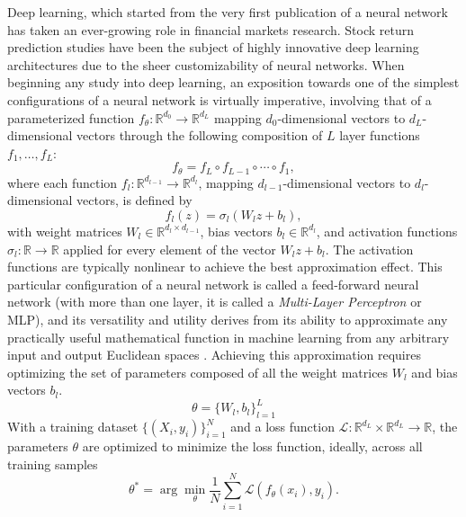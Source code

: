 \documentclass[stu,floatsintext]{apa7}
\begin{document}
Deep learning, which started from the very first publication of a neural network \parencite{rosenblatt1958nn} has taken an ever-growing role in financial markets research. Stock return prediction studies have been the subject of highly innovative deep learning architectures due to the sheer customizability of neural networks. When beginning any study into deep learning, an exposition towards one of the simplest configurations of a neural network is virtually imperative, involving that of a parameterized function $f_{\theta}:\mathbb{R}^{d_0}\to\mathbb{R}^{d_L}$ mapping $d_0$-dimensional vectors to $d_L$-dimensional vectors through the following composition of $L$ layer functions $f_1,\dots,f_L$:
\begin{equation}f_{\theta} = f_L \circ f_{L-1} \circ \cdots \circ f_1,\end{equation}
where each function $f_l:\mathbb{R}^{d_{l-1}}\to\mathbb{R}^{d_l}$, mapping $d_{l-1}$-dimensional vectors to $d_l$-dimensional vectors, is defined by
\begin{equation}f_l(z) = \sigma_l\left(W_l z + b_l\right),\end{equation}
with weight matrices $W_l \in \mathbb{R}^{d_l \times d_{l-1}}$, bias vectors $b_l \in \mathbb{R}^{d_l}$, and activation functions $\sigma_l: \mathbb{R} \rightarrow \mathbb{R}$ applied for every element of the vector $W_lz+b_l$. The activation functions are typically nonlinear to achieve the best approximation effect. This particular configuration of a neural network is called a feed-forward neural network (with more than one layer, it is called a \textit{Multi-Layer Perceptron} or MLP), and its versatility and utility derives from its ability to approximate any practically useful mathematical function in machine learning from any arbitrary input and output Euclidean spaces \parencite{hornik1979ffn}. Achieving this approximation requires optimizing the set of parameters composed of all the weight matrices $W_l$ and bias vectors $b_l$.
\begin{equation}\theta = \{W_l, b_l\}_{l=1}^{L}\end{equation}
With a training dataset $\{(X_i, y_i)\}_{i=1}^{N}$ and a loss function $\mathcal{L}:\mathbb{R}^{d_L}\times\mathbb{R}^{d_L}\to\mathbb R$, the parameters $\theta$ are optimized to minimize the loss function, ideally, across all training samples
\begin{equation}\theta^{*} = \arg\min_{\theta} \frac{1}{N}\sum_{i=1}^{N} \mathcal{L}\left(f_{\theta}(x_i), y_i\right).\end{equation}
\end{document}
